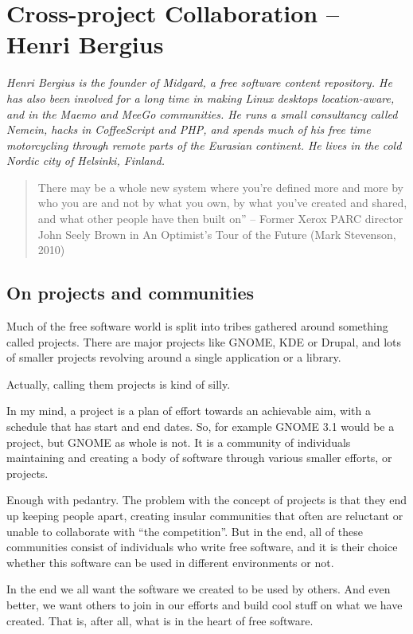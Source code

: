 \chapter{Cross-project Collaboration -- Henri Bergius}

\textit{Henri Bergius is the founder of Midgard, a free software content
repository. He has also been involved for a long time in making Linux desktops
location-aware, and in the Maemo and MeeGo communities. He runs a small
consultancy called Nemein, hacks in CoffeeScript and PHP, and spends much of his
free time motorcycling through remote parts of the Eurasian continent. He lives
in the cold Nordic city of Helsinki, Finland.}

\begin{quote}
There may be a whole new system where you're defined more and more by who you
are and not by what you own, by what you've created and shared, and what other
people have then built on” -- Former Xerox PARC director John Seely Brown in An
Optimist's Tour of the Future (Mark Stevenson, 2010)
\end{quote}

\section*{On projects and communities}

Much of the free software world is split into tribes gathered around something
called projects. There are major projects like GNOME, KDE or Drupal, and lots of
smaller projects revolving around a single application or a library.

Actually, calling them projects is kind of silly.

In my mind, a project is a plan of effort towards an achievable aim, with a
schedule that has start and end dates. So, for example GNOME 3.1 would be a
project, but GNOME as whole is not. It is a community of individuals maintaining
and creating a body of software through various smaller efforts, or projects.

Enough with pedantry. The problem with the concept of projects is that they end
up keeping people apart, creating insular communities that often are reluctant
or unable to collaborate with ``the competition''. But in the end, all of these
communities consist of individuals who write free software, and it is their
choice whether this software can be used in different environments or not.

In the end we all want the software we created to be used by others. And even
better, we want others to join in our efforts and build cool stuff on what we
have created. That is, after all, what is in the heart of free software.

